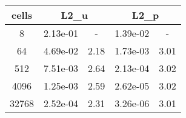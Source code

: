 \documentclass[10pt]{report}
\begin{document}
\begin{table}[H]
\begin{center}
\begin{tabular}{|c|c|c|c|c|} \hline
cells & 
\multicolumn{2}{|c|}{L2_u} & 
\multicolumn{2}{|c|}{L2_p}\\ \hline
8 & 2.13e-01 & - & 1.39e-02 & -\\ \hline
64 & 4.69e-02 & 2.18 & 1.73e-03 & 3.01\\ \hline
512 & 7.51e-03 & 2.64 & 2.13e-04 & 3.02\\ \hline
4096 & 1.25e-03 & 2.59 & 2.62e-05 & 3.02\\ \hline
32768 & 2.52e-04 & 2.31 & 3.26e-06 & 3.01\\ \hline
\end{tabular}
\end{center}
\end{table}
\end{document}
